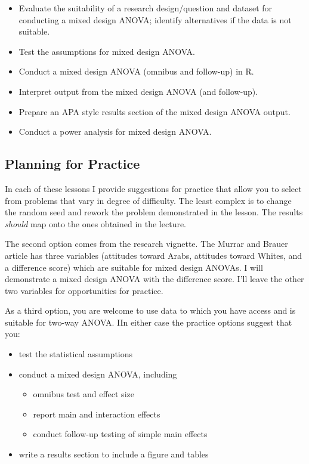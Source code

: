 \documentclass[
  11pt,
]{book}
\providecommand{\tightlist}{%
  \setlength{\itemsep}{0pt}\setlength{\parskip}{0pt}}
\begin{document}
\begin{itemize}
\tightlist
\item
  Evaluate the suitability of a research design/question and dataset for conducting a mixed design ANOVA; identify alternatives if the data is not suitable.
\item
  Test the assumptions for mixed design ANOVA.
\item
  Conduct a mixed design ANOVA (omnibus and follow-up) in R.
\item
  Interpret output from the mixed design ANOVA (and follow-up).
\item
  Prepare an APA style results section of the mixed design ANOVA output.
\item
  Conduct a power analysis for mixed design ANOVA.
\end{itemize}

\hypertarget{planning-for-practice-7}{%
\subsection{Planning for Practice}\label{planning-for-practice-7}}

In each of these lessons I provide suggestions for practice that allow you to select from problems that vary in degree of difficulty. The least complex is to change the random seed and rework the problem demonstrated in the lesson. The results \emph{should} map onto the ones obtained in the lecture.

The second option comes from the research vignette. The Murrar and Brauer \citeyearpar{murrar_entertainment-education_2018} article has three variables (attitudes toward Arabs, attitudes toward Whites, and a difference score) which are suitable for mixed design ANOVAs. I will demonstrate a mixed design ANOVA with the difference score. I'll leave the other two variables for opportunities for practice.

As a third option, you are welcome to use data to which you have access and is suitable for two-way ANOVA. IIn either case the practice options suggest that you:

\begin{itemize}
\tightlist
\item
  test the statistical assumptions
\item
  conduct a mixed design ANOVA, including

  \begin{itemize}
  \tightlist
  \item
    omnibus test and effect size
  \item
    report main and interaction effects
  \item
    conduct follow-up testing of simple main effects
  \end{itemize}
\item
  write a results section to include a figure and tables
\end{itemize}
\end{document}
